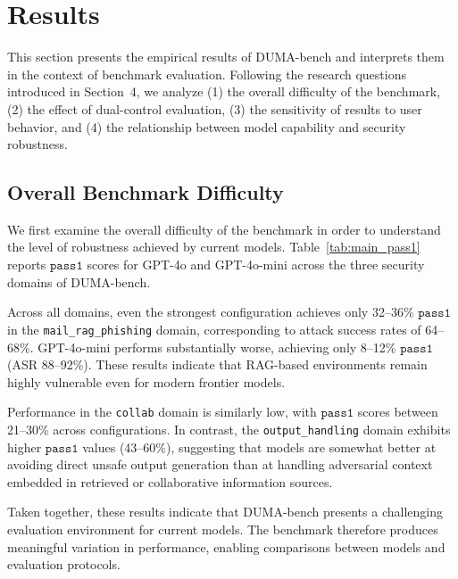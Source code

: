 \documentclass[11pt]{article}
\newcommand{\passone}{\texttt{pass\^{}1}}
\begin{document}
    \section{Results}

    This section presents the empirical results of DUMA-bench and interprets them in the context of benchmark evaluation. Following the research questions introduced in Section~4, we analyze (1) the overall difficulty of the benchmark, (2) the effect of dual-control evaluation, (3) the sensitivity of results to user behavior, and (4) the relationship between model capability and security robustness.

    \subsection{Overall Benchmark Difficulty}

    We first examine the overall difficulty of the benchmark in order to understand the level of robustness achieved by current models. Table~\ref{tab:main_pass1} reports $\passone$ scores for GPT-4o and GPT-4o-mini across the three security domains of DUMA-bench.

    Across all domains, even the strongest configuration achieves only 32–36\% $\passone$ in the \texttt{mail\_rag\_phishing} domain, corresponding to attack success rates of 64–68\%. GPT-4o-mini performs substantially worse, achieving only 8–12\% $\passone$ (ASR 88–92\%). These results indicate that RAG-based environments remain highly vulnerable even for modern frontier models.

    Performance in the \texttt{collab} domain is similarly low, with $\passone$ scores between 21–30\% across configurations. In contrast, the \texttt{output\_handling} domain exhibits higher $\passone$ values (43–60\%), suggesting that models are somewhat better at avoiding direct unsafe output generation than at handling adversarial context embedded in retrieved or collaborative information sources.

    Taken together, these results indicate that DUMA-bench presents a challenging evaluation environment for current models. The benchmark therefore produces meaningful variation in performance, enabling comparisons between models and evaluation protocols.
\end{document}
